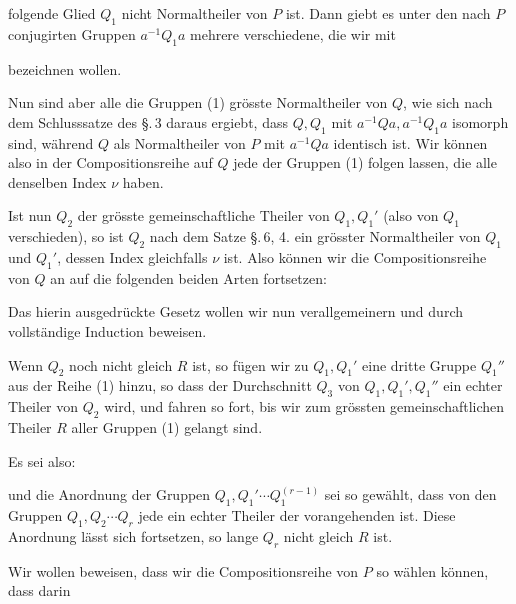 
folgende Glied $Q_1$ nicht Normaltheiler von $P$ ist. Dann giebt
es unter den nach $P$ conjugirten Gruppen $a^{-1} Q_1 a$ mehrere verschiedene,
die wir mit


bezeichnen wollen. 

Nun sind aber alle die Gruppen (1) grösste Normaltheiler
von $Q$, wie sich nach dem Schlusssatze des \S.\,3 daraus ergiebt,
dass $Q, Q_1$ mit $a^{-1} Q a, a^{-1} Q_1 a$ isomorph sind, während $Q$ als
Normaltheiler von $P$ mit $a^{-1} Q a$ identisch ist. Wir können also
in der Compositionsreihe auf $Q$ jede der Gruppen (1) folgen
lassen, die alle denselben Index $\nu$ haben.

Ist nun $Q_2$ der grösste gemeinschaftliche Theiler von $Q_1, Q_1'$
(also von $Q_1$ verschieden), so ist $Q_2$ nach dem Satze \S.\,6, 4. ein
grösster Normaltheiler von $Q_1$ und $Q_1'$, dessen Index gleichfalls
$\nu$ ist. Also können wir die Compositionsreihe von $Q$ an auf die
folgenden beiden Arten fortsetzen:


Das hierin ausgedrückte Gesetz wollen wir nun verallgemeinern
und durch vollständige Induction beweisen.

Wenn $Q_2$ noch nicht gleich $R$ ist, so fügen wir zu $Q_1, Q_1'$
eine dritte Gruppe $Q_1''$ aus der Reihe (1) hinzu, so dass der
Durchschnitt $Q_3$ von $Q_1, Q_1', Q_1''$ ein echter Theiler von $Q_2$ wird,
und fahren so fort, bis wir zum grössten gemeinschaftlichen
Theiler $R$ aller Gruppen (1) gelangt sind.

Es sei also:


und die Anordnung der Gruppen $Q_1, Q_1' \cdots Q_1^{(r-1)}$ sei so gewählt,
dass von den Gruppen $Q_1, Q_2 \cdots Q_r$ jede ein echter
Theiler der vorangehenden ist. Diese Anordnung lässt sich fortsetzen,
so lange $Q_r$ nicht gleich $R$ ist.

Wir wollen beweisen, dass wir die Compositionsreihe von $P$
so wählen können, dass darin

